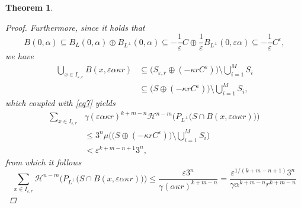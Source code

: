 \documentclass[pdflatex,sn-mathphys-num]{sn-jnl}
\theoremstyle{plain}
\newtheorem{theorem}{Theorem}[section]
\theoremstyle{definition}
\begin{document}
\begin{theorem}
\begin{proof}
        
        Furthermore, since it holds that $$B(0, \alpha)\subseteq B_L(0, \alpha)\oplus B_{L^{\perp}}(0, \alpha)\subseteq-\frac{1}{\varepsilon}C\oplus \frac{1}{\varepsilon}B_{L^{\perp}}(0, \varepsilon\alpha)\subseteq -\frac{1}{\varepsilon}C^{\varepsilon},$$
we have \begin{equation*}
    \begin{split}
        \bigcup_{x\in I_{\varepsilon, r}}B(x, \varepsilon\alpha\kappa r)&\subseteq \big(S_{\varepsilon, r}\oplus (-\kappa rC^{\varepsilon})\big)\setminus\bigcup_{i=1}^M S_i\\&\subseteq \big(S\oplus (-\kappa rC^{\varepsilon})\big)\setminus\bigcup_{i=1}^M S_i,
    \end{split}
\end{equation*}
which coupled with \eqref{eq7} yields \begin{equation*}\begin{split}
\sum_{x\in I_{\varepsilon, r}}&\gamma(\varepsilon\alpha\kappa r)^{k+m-n}\mathcal{H}^{n-m}\Big(P_{L^{\perp}}\big(S\cap B(x, \varepsilon\alpha\kappa r)\big)\Big)\\&\leq 3^n\mu\Big(\big(S\oplus (-\kappa r C^{\varepsilon})\big)\setminus\bigcup_{i=1}^M S_i\bigg)\\&<\varepsilon^{k+m-n+1} 3^n,\end{split}
\end{equation*} from which it follows \begin{equation}\label{odhad}
    \sum_{x\in I_{\varepsilon, r}}\mathcal{H}^{n-m}\Big(P_{L^{\perp}}\big(S\cap B(x, \varepsilon\alpha\kappa r)\big)\Big)\leq \frac{\varepsilon 3^n}{\gamma(\alpha\kappa r)^{k+m-n}}=\frac{\varepsilon^{1/(k+m-n+1)} 3^n}{\gamma\alpha^{k+m-n} r^{k+m-n}}
\end{equation}


\end{proof}
\end{theorem}
\end{document}
